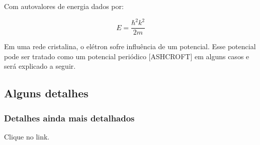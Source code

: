 \documentclass[11pt]{article}
\numberwithin{equation}{section}
\begin{document}
      Com autovalores de energia dados por:

      \begin{equation}\label{eq_schrodinger_autovalores}
        E = \frac{\hbar^2 k^2}{2m}
      \end{equation}

      Em uma rede cristalina, o elétron sofre influência de um potencial. Esse potencial pode ser tratado como um potencial periódico [ASHCROFT] em alguns casos e será explicado a seguir.

      


      




 
\subsection{Alguns detalhes}


\subsubsection{Detalhes ainda mais detalhados}
Clique no link.
\end{document}
